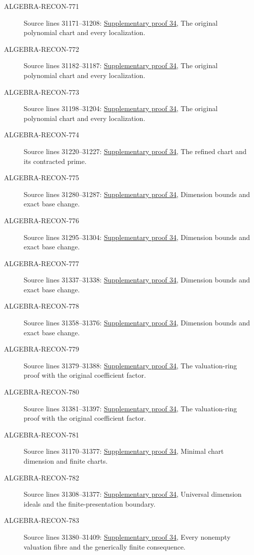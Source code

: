 \begin{description}
\item[ALGEBRA-RECON-771] Source lines 31171--31208: \hyperlink{algebra_fibre_dimension_notes_20260928}{Supplementary proof 34}, The original polynomial chart and every localization.
\item[ALGEBRA-RECON-772] Source lines 31182--31187: \hyperlink{algebra_fibre_dimension_notes_20260928}{Supplementary proof 34}, The original polynomial chart and every localization.
\item[ALGEBRA-RECON-773] Source lines 31198--31204: \hyperlink{algebra_fibre_dimension_notes_20260928}{Supplementary proof 34}, The original polynomial chart and every localization.
\item[ALGEBRA-RECON-774] Source lines 31220--31227: \hyperlink{algebra_fibre_dimension_notes_20260928}{Supplementary proof 34}, The refined chart and its contracted prime.
\item[ALGEBRA-RECON-775] Source lines 31280--31287: \hyperlink{algebra_fibre_dimension_notes_20260928}{Supplementary proof 34}, Dimension bounds and exact base change.
\item[ALGEBRA-RECON-776] Source lines 31295--31304: \hyperlink{algebra_fibre_dimension_notes_20260928}{Supplementary proof 34}, Dimension bounds and exact base change.
\item[ALGEBRA-RECON-777] Source lines 31337--31338: \hyperlink{algebra_fibre_dimension_notes_20260928}{Supplementary proof 34}, Dimension bounds and exact base change.
\item[ALGEBRA-RECON-778] Source lines 31358--31376: \hyperlink{algebra_fibre_dimension_notes_20260928}{Supplementary proof 34}, Dimension bounds and exact base change.
\item[ALGEBRA-RECON-779] Source lines 31379--31388: \hyperlink{algebra_fibre_dimension_notes_20260928}{Supplementary proof 34}, The valuation-ring proof with the original coefficient factor.
\item[ALGEBRA-RECON-780] Source lines 31381--31397: \hyperlink{algebra_fibre_dimension_notes_20260928}{Supplementary proof 34}, The valuation-ring proof with the original coefficient factor.
\item[ALGEBRA-RECON-781] Source lines 31170--31377: \hyperlink{algebra_fibre_dimension_notes_20260928}{Supplementary proof 34}, Minimal chart dimension and finite charts.
\item[ALGEBRA-RECON-782] Source lines 31308--31377: \hyperlink{algebra_fibre_dimension_notes_20260928}{Supplementary proof 34}, Universal dimension ideals and the finite-presentation boundary.
\item[ALGEBRA-RECON-783] Source lines 31380--31409: \hyperlink{algebra_fibre_dimension_notes_20260928}{Supplementary proof 34}, Every nonempty valuation fibre and the generically finite consequence.
\end{description}

